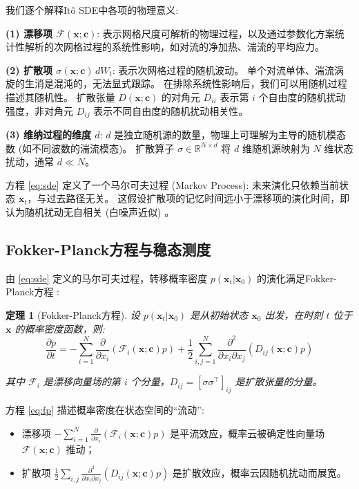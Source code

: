 \documentclass[12pt, a4paper]{article}
\newtheorem{theorem}{定理}[section]
\newcommand{\R}{\mathbb{R}}
\newcommand{\fastvar}{\bm{x}}          %
\newcommand{\slowvar}{\bm{c}}          %
\newcommand{\drift}{\mathcal{F}}  %
\newcommand{\diffop}{\sigma}      %
\newcommand{\difftensor}{D}       %
\newcommand{\wiener}{W}           %
\newcommand{\probdens}{p}           %
\begin{document}
我们逐个解释Itô SDE中各项的物理意义:

\textbf{(1) 漂移项 $\drift(\fastvar; \slowvar)$}:
表示网格尺度可解析的物理过程，以及通过参数化方案统计性解析的次网格过程的系统性影响，如对流的净加热、湍流的平均应力。

\textbf{(2) 扩散项 $\diffop(\fastvar; \slowvar)\,d\wiener_t$}:
表示次网格过程的随机波动。
单个对流单体、湍流涡旋的生消是混沌的，无法显式跟踪。
在排除系统性影响后，我们可以用随机过程描述其随机性。
扩散张量 $\difftensor(\fastvar; \slowvar)$ 的对角元 $\difftensor_{ii}$ 表示第 $i$ 个自由度的随机扰动强度，非对角元 $\difftensor_{ij}$ 表示不同自由度的随机扰动相关性。

\textbf{(3) 维纳过程的维度 $d$}:
$d$ 是独立随机源的数量，物理上可理解为主导的随机模态数 (如不同波数的湍流模态)。
扩散算子 $\diffop \in \R^{N \times d}$ 将 $d$ 维随机源映射为 $N$ 维状态扰动，通常 $d \ll N$。

方程 \eqref{eq:sde} 定义了一个马尔可夫过程 (Markov Process): 未来演化只依赖当前状态 $\fastvar_t$，与过去路径无关。
这假设扩散项的记忆时间远小于漂移项的演化时间，即认为随机扰动无自相关 (白噪声近似) 。

\subsection{Fokker-Planck方程与稳态测度}

由 \eqref{eq:sde} 定义的马尔可夫过程，转移概率密度 $\probdens(\fastvar_t | \fastvar_0)$ 的演化满足Fokker-Planck方程 \cite{gardiner2009stochastic}:

\begin{theorem}[Fokker-Planck方程]
\label{thm:fp}
    设 $\probdens(\fastvar_t | \fastvar_0)$ 是从初始状态 $\fastvar_0$ 出发，在时刻 $t$ 位于 $\fastvar$ 的概率密度函数，则:
    \begin{equation}
    \label{eq:fp}
        \frac{\partial \probdens}{\partial t} = -\sum_{i=1}^N \frac{\partial}{\partial x_i}(\drift_i(\fastvar; \slowvar) \probdens) + \frac{1}{2}\sum_{i,j=1}^N \frac{\partial^2}{\partial x_i \partial x_j}(\difftensor_{ij}(\fastvar; \slowvar) \probdens)
    \end{equation}

    其中 $\drift_i$ 是漂移向量场的第 $i$ 个分量，$\difftensor_{ij} = [\diffop\diffop^\top]_{ij}$ 是扩散张量的分量。
\end{theorem}

方程 \eqref{eq:fp} 描述概率密度在状态空间的“流动”:
\begin{itemize}
    \item 漂移项 $-\sum_{i=1}^N \frac{\partial}{\partial x_i}(\drift_i(\fastvar; \slowvar) \probdens)$ 是平流效应，概率云被确定性向量场 $\drift(\fastvar; \slowvar)$ 推动；
    \item 扩散项 $\frac{1}{2}\sum_{i,j} \frac{\partial^2}{\partial x_i \partial x_j}(\difftensor_{ij}(\fastvar; \slowvar) \probdens)$ 是扩散效应，概率云因随机扰动而展宽。
\end{itemize}
\end{document}
